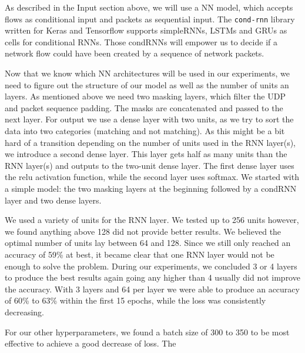 \documentclass[
	ngerman,
	ruledheaders=section,%
	class=report,%
	thesis={type=bachelor},%
	accentcolor=9c,%
	custommargins=true,%
	marginpar=false,%
	parskip=half-,%
	fontsize=11pt,%
]{tudapub}
\begin{document}
As described in the Input section above, we will use a NN model, which accepts flows as conditional input and packets as sequential input.
The \lstinline{cond-rnn} library \cite{remyPhilipperemyCondRnn2020} written for Keras and Tensorflow supports simpleRNNs, LSTMs and GRUs as cells for conditional RNNs.
Those condRNNs will empower us to decide if a network flow could have been created by a sequence of network packets.

Now that we know which NN architectures will be used in our experiments, we need to figure out the structure of our model as well as the number of units an layers.
As mentioned above we need two masking layers, which filter the UDP and packet sequence padding.
The masks are concatenated and passed to the next layer.
For output we use a dense layer with two units, as we try to sort the data into two categories (matching and not matching).
As this might be a bit hard of a transition depending on the number of units used in the RNN layer(s), we introduce a second dense layer.
This layer gets half as many units than the RNN layer(s) and outputs to the two-unit dense layer.
The first dense layer uses the relu activation function, while the second layer uses softmax.
We started with a simple model: the two masking layers at the beginning followed by a condRNN layer and two dense layers.

We used a variety of units for the RNN layer.
We tested up to 256 units however, we found anything above 128 did not provide better results.
We believed the optimal number of units lay between 64 and 128.
Since we still only reached an accuracy of 59\% at best, it became clear that one RNN layer would not be enough to solve the problem.
During our experiments, we concluded 3 or 4 layers to produce the best results again going any higher than 4 usually did not improve the accuracy.
With 3 layers and 64 per layer we were able to produce an accuracy of 60\% to 63\% within the first 15 epochs, while the loss was consistently decreasing.


For our other hyperparameters, we found a batch size of 300 to 350 to be most effective to achieve a good decrease of loss.
The

\end{document}
